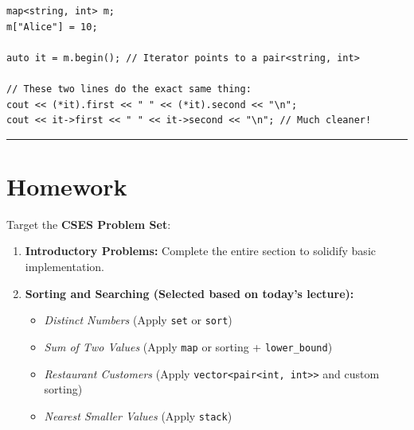 \documentclass[12pt, a4paper]{article}
\begin{document}
\begin{lstlisting}
map<string, int> m;
m["Alice"] = 10;

auto it = m.begin(); // Iterator points to a pair<string, int>

// These two lines do the exact same thing:
cout << (*it).first << " " << (*it).second << "\n";
cout << it->first << " " << it->second << "\n"; // Much cleaner!
\end{lstlisting}

\vspace{0.5cm}
\hrule
\vspace{0.5cm}

\section{Homework}
Target the \textbf{CSES Problem Set}:
\begin{enumerate}
    \item \textbf{Introductory Problems:} Complete the entire section to solidify basic implementation.
    \item \textbf{Sorting and Searching (Selected based on today's lecture):}
    \begin{itemize}
        \item \textit{Distinct Numbers} (Apply \texttt{set} or \texttt{sort})
        \item \textit{Sum of Two Values} (Apply \texttt{map} or sorting + \texttt{lower\_bound})
        \item \textit{Restaurant Customers} (Apply \texttt{vector<pair<int, int>>} and custom sorting)
        \item \textit{Nearest Smaller Values} (Apply \texttt{stack})
    \end{itemize}
\end{enumerate}
\end{document}
